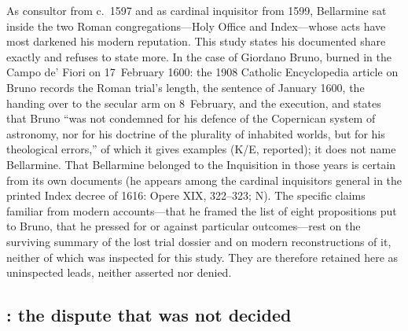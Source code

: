 As consultor from c.~1597 and as cardinal inquisitor from 1599,
Bellarmine sat inside the two Roman congregations---Holy Office and
Index---whose acts have most darkened his modern reputation. This
study states his documented share exactly and refuses to state
more. In the case of Giordano Bruno, burned in the Campo de' Fiori
on 17~February 1600: the 1908 Catholic Encyclopedia article on
Bruno records the Roman trial's length, the sentence of January
1600, the handing over to the secular arm on 8~February, and the
execution, and states that Bruno ``was not condemned for his
defence of the Copernican system of astronomy, nor for his doctrine
of the plurality of inhabited worlds, but for his theological
errors,'' of which it gives examples (K/E, reported); it does not
name Bellarmine. That Bellarmine belonged to the Inquisition in
those years is certain from its own documents (he appears among
the cardinal inquisitors general in the printed Index decree of
1616: Opere XIX, 322--323; N). The specific claims familiar from
modern accounts---that he framed the list of eight propositions
put to Bruno, that he pressed for or against particular
outcomes---rest on the surviving summary of the lost trial dossier
and on modern reconstructions of it, neither of which was inspected
for this study. They are therefore retained here as uninspected
leads, neither asserted nor denied.


\subsection{: the dispute that was not decided}

